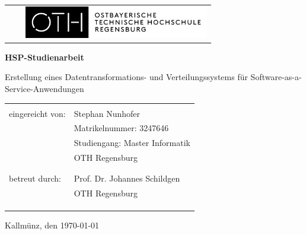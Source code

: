 
\thispagestyle{empty}


\begin{center}

\begin{tabular}{cp{.2cm}c}
 &  & \includegraphics [height=1.4cm]{Bilder/Titel/OTH_Logo_3line_pos_b.png}%
\end{tabular}

\vspace{4cm}



\noindent 
\textbf{\Huge{HSP-Studienarbeit}}

\vspace{1.5cm}

\noindent 
{\Large{Erstellung eines Datentransformations- und Verteilungssystems für Software-as-a-Service-Anwendungen}}


\vspace{3cm}

\begin{tabular}{ll}
\tabularnewline
\tabularnewline
eingereicht von:\hspace{1cm} & Stephan Nunhofer\tabularnewline
 & Matrikelnummer: 3247646\tabularnewline
 & Studiengang: Master Informatik\tabularnewline
 & OTH Regensburg\tabularnewline
 & \tabularnewline
 & \tabularnewline
betreut durch: & Prof. Dr. Johannes Schildgen\tabularnewline
 & OTH Regensburg\tabularnewline
 & \tabularnewline
 & \tabularnewline
 & \tabularnewline
 
\end{tabular}

\end{center}
\begin{center}
Kallmünz, den \today
\end{center}

\thispagestyle{empty}

